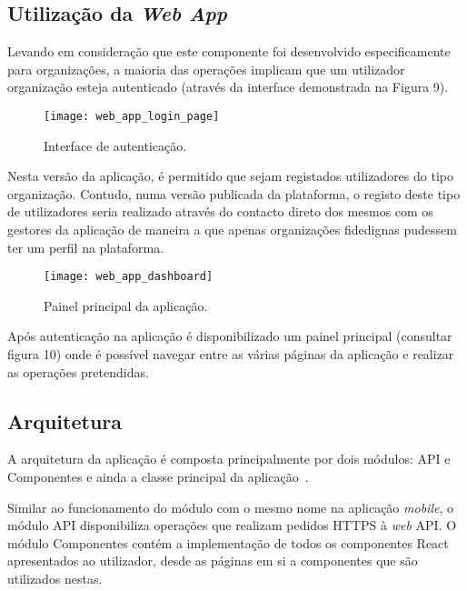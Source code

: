 \subsection{Utilização da \textit{Web App}}

Levando em consideração que este componente foi desenvolvido especificamente para organizações, a maioria das operações implicam que um utilizador organização esteja autenticado (através da interface demonstrada na Figura 9).

\begin{figure}[h]
	\centering
	\texttt{[image: web\_app\_login\_page]}
	\caption{Interface de autenticação.}
\end{figure}

Nesta versão da aplicação, é permitido que sejam registados utilizadores do tipo organização. Contudo, numa versão publicada da plataforma, o registo deste tipo de utilizadores seria realizado através do contacto direto dos mesmos com os gestores da aplicação de maneira a que apenas organizações fidedignas pudessem ter um perfil na plataforma.

\par \medskip

\begin{figure}[h]
	\centering
	\texttt{[image: web\_app\_dashboard]}
	\caption{Painel principal da aplicação.}
\end{figure}

Após autenticação na aplicação é disponibilizado um painel principal (consultar figura 10) onde é possível navegar entre as várias páginas da aplicação e realizar as operações pretendidas.

\par \medskip

\subsection{Arquitetura}

A arquitetura da aplicação é composta principalmente por dois módulos: API e Componentes e ainda a classe principal da aplicação~\cite{Stefanov2016}.

\par \medskip 

Similar ao funcionamento do módulo com o mesmo nome na aplicação \textit{mobile}, o módulo API disponibiliza operações que realizam pedidos HTTPS à \textit{web} API. O módulo Componentes contém a implementação de todos os componentes React apresentados ao utilizador, desde as páginas em si a componentes que são utilizados nestas. 

